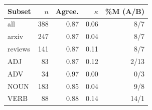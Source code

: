 \begin{tabular}{lrrrr}
\toprule
Subset & $n$ & Agree. & $\kappa$ & \%M (A/B) \\
\midrule
all & 388 & 0.87 & 0.06 & 8/7 \\
arxiv & 247 & 0.87 & 0.04 & 8/7 \\
reviews & 141 & 0.87 & 0.11 & 8/7 \\
ADJ & 83 & 0.87 & 0.12 & 2/13 \\
ADV & 34 & 0.97 & 0.00 & 0/3 \\
NOUN & 183 & 0.85 & 0.04 & 9/8 \\
VERB & 88 & 0.88 & 0.14 & 14/1 \\
\bottomrule
\end{tabular}
